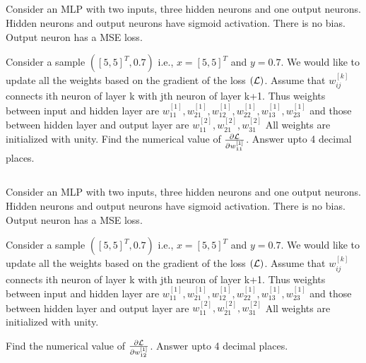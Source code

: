 \begin{frame}
\section{}
Consider an MLP with two inputs, three hidden neurons and one output neurons. Hidden neurons and output neurons have sigmoid activation. There is no bias. Output neuron has a MSE loss.

Consider a sample $([5,5]^T,0.7)$ i.e., $x = [5,5]^T$ and $y=0.7$. We would like to update all the weights based on the gradient of the loss $({\cal L})$. Assume that $w_{ij}^{[k]}$ connects ith neuron of layer k with jth neuron of layer k+1. Thus weights between input and hidden layer are $w_{11}^{[1]}, w_{21}^{[1]}, w_{12}^{[1]}, w_{22}^{[1]}, w_{13}^{[1]}, w_{23}^{[1]}$ and those between hidden layer and output layer are $w_{11}^{[2]}, w_{21}^{[2]}, w_{31}^{[2]}$
All weights are initialized with unity.
Find the numerical value of $\frac{\partial \cal L}{\partial w_{11}^{[1]}}$. Answer upto 4 decimal places.


\end{frame}

\begin{frame}
\section{}
Consider an MLP with two inputs, three hidden neurons and one output neurons. Hidden neurons and output neurons have sigmoid activation. There is no bias. Output neuron has a MSE loss.

Consider a sample $([5,5]^T,0.7)$ i.e., $x = [5,5]^T$ and $y=0.7$. We would like to update all the weights based on the gradient of the loss $({\cal L})$. Assume that $w_{ij}^{[k]}$ connects ith neuron of layer k with jth neuron of layer k+1. Thus weights between input and hidden layer are $w_{11}^{[1]}, w_{21}^{[1]}, w_{12}^{[1]}, w_{22}^{[1]}, w_{13}^{[1]}, w_{23}^{[1]}$ and those between hidden layer and output layer are $w_{11}^{[2]}, w_{21}^{[2]}, w_{31}^{[2]}$
All weights are initialized with unity.

Find the numerical value of $\frac{\partial \cal L}{\partial w_{12}^{[1]}}$. Answer upto 4 decimal places.


\end{frame}

